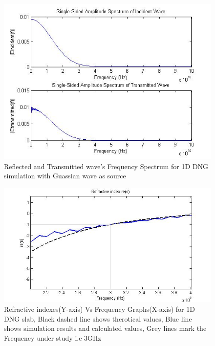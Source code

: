 \begin{figure}[htbp]
	\centering
		\includegraphics[width=5in]{Figures/drude5.jpg}
	\caption[Reflected and Transmitted wave's Frequency Spectrum for 1D DNG simulation]{Reflected and Transmitted wave's Frequency Spectrum for 1D DNG simulation with Guassian wave as source}
	\label{drude5}
\end{figure}
\begin{figure}[htbp]
	\centering
		\includegraphics[width=5in]{Figures/drude4.jpg}
	\caption[Refractive Index vs Frequency for 1D DNG slab]{Refractive indexes(Y-axis) Vs Frequency Graphs(X-axis) for 1D DNG slab, Black dashed line shows therotical values, Blue line shows simulation results and calculated values, Grey lines mark the Frequency under study i.e 3GHz }
	\label{drude4}
\end{figure}

